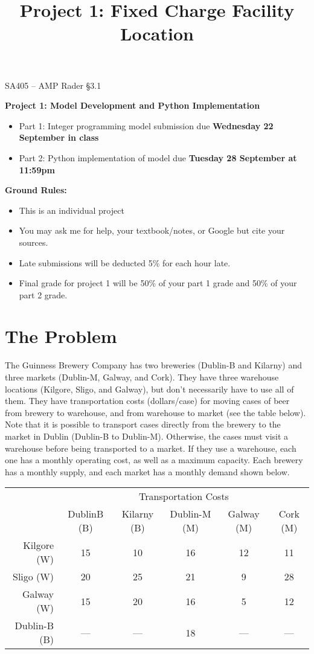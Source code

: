 \documentclass[11pt]{article}
\makeatletter
\newcommand{\blu}{\color{blue}}
\theoremstyle{definition}
\renewcommand{\maketitle}{
  \noindent SA405 -- AMP \hfill Rader \S 3.1 \\

  \begin{center}\Large{\textbf{\@title}}\end{center}
}
\makeatother
\begin{document}
  
\title{Project 1:  Fixed Charge Facility Location}

\maketitle

{\blu \Large \textbf{Project 1: Model Development and Python Implementation}}
	\begin{itemize}
	\item Part 1: Integer programming model submission due \textbf{Wednesday 22 September in class}
	\item Part 2: Python implementation of model due \textbf{Tuesday 28 September at 11:59pm}
	\end{itemize}

{\blu \Large \bf Ground Rules:}
	\begin{itemize}
	\item This is an individual project
	\item You may ask me for help, your textbook/notes, or Google but cite your sources.
	\item Late submissions will be deducted 5\% for each hour late.
	\item Final grade for project 1 will be 50\% of your part 1 grade and 50\% of your part 2 grade.
	\end{itemize}

\section{The Problem}

The Guinness Brewery Company has two breweries (Dublin-B and Kilarny) and three markets (Dublin-M, Galway, and Cork). They have three warehouse locations (Kilgore, Sligo, and Galway), but don't necessarily have to use all of them. They have transportation costs (dollars/case) for moving cases of beer from brewery to warehouse, and from warehouse to market (see the table below).  Note that it is possible to transport cases directly from the brewery to the market in Dublin (Dublin-B to Dublin-M).  Otherwise, the cases must visit a warehouse before being transported to a market.  If they use a warehouse, each one has a monthly operating cost, as well as a maximum capacity.  Each brewery has a monthly supply, and each market has a monthly demand shown below.


\begin{center}
\begin{tabular}{r|ccccc}
& \multicolumn{5}{c}{Transportation Costs} \\
& DublinB (B) & Kilarny (B) & Dublin-M (M) & Galway (M) & Cork (M) \\
\hline
Kilgore (W) & 15 & 10 & 16 & 12 & 11  \\
Sligo (W) &  20 & 25 & 21 & 9 & 28  \\
Galway (W) & 15 & 20 & 16 & 5 & 12 \\
Dublin-B (B) &  --- & --- & 18 & --- & --- \\
\hline
\end{tabular}
\end{center}
\end{document}
